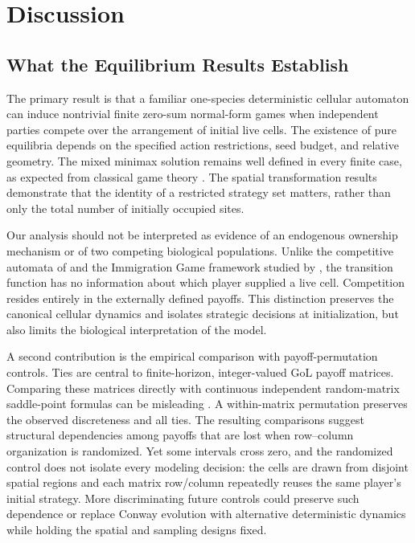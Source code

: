 \documentclass[games,article,submit,moreauthors]{Definitions/mdpi}
\begin{document}
\section{Discussion}\label{sec:discussion}

\subsection{What the Equilibrium Results Establish}

The primary result is that a familiar one-species deterministic cellular automaton can induce nontrivial finite zero-sum normal-form games when independent parties compete over the arrangement of initial live cells. The existence of pure equilibria depends on the specified action restrictions, seed budget, and relative geometry. The mixed minimax solution remains well defined in every finite case, as expected from classical game theory \citep{vonNeumann1944,nash1951}. The spatial transformation results demonstrate that the identity of a restricted strategy set matters, rather than only the total number of initially occupied sites.

Our analysis should not be interpreted as evidence of an endogenous ownership mechanism or of two competing biological populations. Unlike the competitive automata of \citet{levene2003} and the Immigration Game framework studied by \citet{turney2021}, the transition function has no information about which player supplied a live cell. Competition resides entirely in the externally defined payoffs. This distinction preserves the canonical cellular dynamics and isolates strategic decisions at initialization, but also limits the biological interpretation of the model.

A second contribution is the empirical comparison with payoff-permutation controls. Ties are central to finite-horizon, integer-valued GoL payoff matrices. Comparing these matrices directly with continuous independent random-matrix saddle-point formulas can be misleading \citep{thorp1979}. A within-matrix permutation preserves the observed discreteness and all ties. The resulting comparisons suggest structural dependencies among payoffs that are lost when row--column organization is randomized. Yet some intervals cross zero, and the randomized control does not isolate every modeling decision: the cells are drawn from disjoint spatial regions and each matrix row/column repeatedly reuses the same player's initial strategy. More discriminating future controls could preserve such dependence or replace Conway evolution with alternative deterministic dynamics while holding the spatial and sampling designs fixed.
\end{document}

